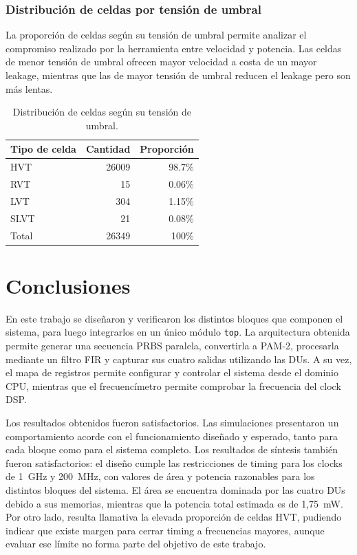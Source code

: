\documentclass[10pt,a4paper]{article}
\begin{document}
\subsubsection*{Distribución de celdas por tensión de umbral}

La proporción de celdas según su tensión de umbral permite analizar el compromiso
realizado por la herramienta entre velocidad y potencia. Las celdas de menor tensión 
de umbral ofrecen mayor velocidad a costa de un mayor leakage, mientras que las de 
mayor tensión de umbral reducen el leakage pero son más lentas.

\begin{table}[H]
    \centering
    \caption{Distribución de celdas según su tensión de umbral.}
    \label{tab:top-vt}
    \begin{tabular}{@{}lrr@{}}
        \toprule
        \textbf{Tipo de celda} & \textbf{Cantidad} & \textbf{Proporción} \\
        \midrule
        HVT  & 26009 & 98.7\% \\
        RVT  & 15    & 0.06\% \\
        LVT  & 304   & 1.15\% \\
        SLVT & 21    & 0.08\% \\
        \midrule
        Total & 26349 & 100\% \\
        \bottomrule
    \end{tabular}
\end{table}

\section{Conclusiones}
\label{sec:conclusiones}

En este trabajo se diseñaron y verificaron los distintos bloques que componen el
sistema, para luego integrarlos en un único módulo \texttt{top}. La arquitectura
obtenida permite generar una secuencia PRBS paralela, convertirla a PAM-2,
procesarla mediante un filtro FIR y capturar sus cuatro salidas utilizando las
DUs. A su vez, el mapa de registros permite configurar y controlar el sistema
desde el dominio CPU, mientras que el frecuencímetro permite comprobar la
frecuencia del clock DSP.

Los resultados obtenidos fueron satisfactorios. Las simulaciones presentaron un
comportamiento acorde con el funcionamiento diseñado y esperado, tanto para cada
bloque como para el sistema completo. Los resultados de síntesis también fueron 
satisfactorios: el diseño cumple las restricciones de timing para los clocks de 
1~GHz y 200~MHz, con valores de área y potencia razonables para los distintos 
bloques del sistema. El área se encuentra dominada por las cuatro DUs debido a 
sus memorias, mientras que la potencia total estimada es de 1,75~mW. Por otro 
lado, resulta llamativa la elevada proporción de celdas HVT, pudiendo indicar 
que existe margen para cerrar timing a frecuencias mayores, aunque evaluar ese 
límite no forma parte del objetivo de este trabajo.
\end{document}
